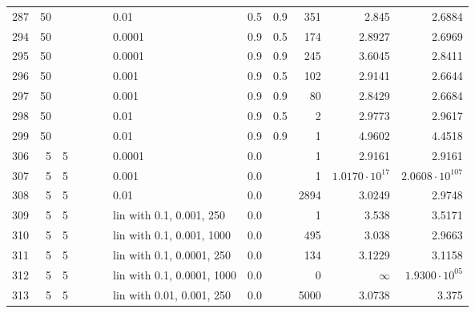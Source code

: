 \begin{longtable}{lrrrrrlrrrrr}
 287 &      50 &   &   &   &   &                        0.01 &  0.5 &    0.9 &     351 &                  2.845 &                 2.6884 \\
 294 &      50 &   &   &   &   &                      0.0001 &  0.9 &    0.5 &     174 &                 2.8927 &                 2.6969 \\
 295 &      50 &   &   &   &   &                      0.0001 &  0.9 &    0.9 &     245 &                 3.6045 &                 2.8411 \\
 296 &      50 &   &   &   &   &                       0.001 &  0.9 &    0.5 &     102 &                 2.9141 &                 2.6644 \\
 297 &      50 &   &   &   &   &                       0.001 &  0.9 &    0.9 &      80 &                 2.8429 &                 2.6684 \\
 298 &      50 &   &   &   &   &                        0.01 &  0.9 &    0.5 &       2 &                 2.9773 &                 2.9617 \\
 299 &      50 &   &   &   &   &                        0.01 &  0.9 &    0.9 &       1 &                 4.9602 &                 4.4518 \\
 306 &       5 & 5 &   &   &   &                      0.0001 &  0.0 &        &       1 &                 2.9161 &                 2.9161 \\
 307 &       5 & 5 &   &   &   &                       0.001 &  0.0 &        &       1 &  $1.0170\cdot 10^{17}$ & $2.0608\cdot 10^{107}$ \\
 308 &       5 & 5 &   &   &   &                        0.01 &  0.0 &        &    2894 &                 3.0249 &                 2.9748 \\
 309 &       5 & 5 &   &   &   &    lin with 0.1, 0.001, 250 &  0.0 &        &       1 &                  3.538 &                 3.5171 \\
 310 &       5 & 5 &   &   &   &   lin with 0.1, 0.001, 1000 &  0.0 &        &     495 &                  3.038 &                 2.9663 \\
 311 &       5 & 5 &   &   &   &   lin with 0.1, 0.0001, 250 &  0.0 &        &     134 &                 3.1229 &                 3.1158 \\
 312 &       5 & 5 &   &   &   &  lin with 0.1, 0.0001, 1000 &  0.0 &        &       0 &               $\infty$ &  $1.9300\cdot 10^{05}$ \\
 313 &       5 & 5 &   &   &   &   lin with 0.01, 0.001, 250 &  0.0 &        &    5000 &                 3.0738 &                  3.375 \\

\end{longtable}
